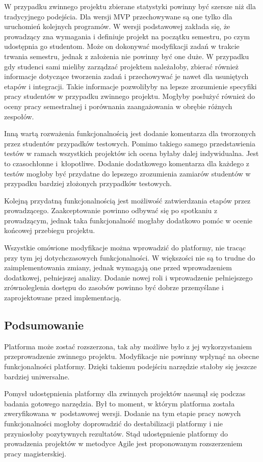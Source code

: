 W przypadku zwinnego projektu zbierane statystyki powinny być szersze niż dla tradycyjnego podejścia.
Dla wersji MVP przechowywane są one tylko dla uruchomień kolejnych programów.
W wersji podstawowej zakłada się, że prowadzący zna wymagania i definiuje projekt na początku semestru, po czym udostępnia go studentom.
Może on dokonywać modyfikacji zadań w trakcie trwania semestru, jednak z założenia nie powinny być one duże.
W przypadku gdy studenci sami mieliby zarządzać projektem należałoby, zbierać również informacje dotyczące tworzenia zadań i przechowywać je nawet dla usuniętych etapów i integracji.
Takie informacje pozwoliłyby na lepsze zrozumienie specyfiki pracy studentów w przypadku zwinnego projektu.
Mogłyby posłużyć również do oceny pracy semestralnej i porównania zaangażowania w obrębie różnych zespołów.

Inną wartą rozważenia funkcjonalnością jest dodanie komentarza dla tworzonych przez studentów przypadków testowych.
Pomimo takiego samego przedstawienia testów w ramach wszystkich projektów ich ocena byłaby dalej indywidualna.
Jest to czasochłonne i~kłopotliwe.
Dodanie dodatkowego komentarza dla każdego z testów mogłoby być przydatne do lepszego zrozumienia zamiarów studentów w przypadku bardziej złożonych przypadków testowych.

Kolejną przydatną funkcjonalnością jest możliwość zatwierdzania etapów przez prowadzącego.
Zaakceptowanie powinno odbywać się po spotkaniu z prowadzącym, jednak taka funkcjonalność mogłaby dodatkowo pomóc w ocenie końcowej przebiegu projektu.

Wszystkie omówione modyfikacje można wprowadzić do platformy, nie tracąc przy tym jej dotychczasowych funkcjonalności.
W większości nie są to trudne do zaimplementowania zmiany, jednak wymagają one przed wprowadzeniem dodatkowej, pełniejszej analizy.
Dodanie nowej roli i wprowadzenie pełniejszego zrównoleglenia dostępu do zasobów powinno być dobrze przemyślane i zaprojektowane przed implementacją.

\subsection{Podsumowanie}

Platforma może zostać rozszerzona, tak aby możliwe było z jej wykorzystaniem przeprowadzenie zwinnego projektu.
Modyfikacje nie powinny wpłynąć na obecne funkcjonalności platformy.
Dzięki takiemu podejściu narzędzie stałoby się jeszcze bardziej uniwersalne.

Pomysł udostępnienia platformy dla zwinnych projektów nasunął się podczas badania gotowego narzędzia.
Był to moment, w którym platforma została zweryfikowana w~podstawowej wersji.
Dodanie na tym etapie pracy nowych funkcjonalności mogłoby doprowadzić do destabilizacji platformy i nie przyniosłoby pozytywnych rezultatów.
Stąd udostępnienie platformy do prowadzenia projektów w metodyce Agile jest proponowanym rozszerzeniem pracy magisterskiej.


